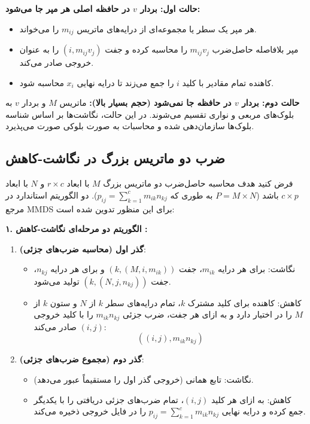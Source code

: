 \textbf{حالت اول: بردار $v$ در حافظه اصلی هر مپر جا می‌شود:}
\begin{itemize}
    \item هر مپر یک سطر یا مجموعه‌ای از درایه‌های ماتریس $m_{ij}$ را می‌خواند.
    \item مپر بلافاصله حاصل‌ضرب $m_{ij} v_j$ را محاسبه کرده و جفت $(i, m_{ij} v_j)$ را به عنوان خروجی صادر می‌کند.
    \item کاهنده تمام مقادیر با کلید $i$ را جمع می‌زند تا درایه نهایی $x_i$ محاسبه شود.
\end{itemize}

\textbf{حالت دوم: بردار $v$ در حافظه جا نمی‌شود (حجم بسیار بالا):}
ماتریس $M$ و بردار $v$ به بلوک‌های مربعی و نواری تقسیم می‌شوند. در این حالت، نگاشت‌ها بر اساس شناسه بلوک‌ها سازمان‌دهی شده و محاسبات به صورت بلوکی صورت می‌پذیرد.

\subsection{ضرب دو ماتریس بزرگ در نگاشت-کاهش \texorpdfstring{}{(Matrix Multiplication)}}
فرض کنید هدف محاسبه حاصل‌ضرب دو ماتریس بزرگ $M$ با ابعاد $r \times c$ و $N$ با ابعاد $c \times p$ باشد ($P = M \times N$ به طوری که $p_{ij} = \sum_{k=1}^c m_{ik} n_{kj}$). دو الگوریتم استاندارد در مرجع MMDS برای این منظور تدوین شده است:

\textbf{۱. الگوریتم دو مرحله‌ای نگاشت-کاهش :}
\begin{enumerate}
    \item \textbf{گذر اول (محاسبه ضرب‌های جزئی)}:
    \begin{itemize}
        \item نگاشت: برای هر درایه $m_{ik}$، جفت $(k, (M, i, m_{ik}))$ و برای هر درایه $n_{kj}$، جفت $(k, (N, j, n_{kj}))$ تولید می‌شود.
        \item کاهش: کاهنده برای کلید مشترک $k$، تمام درایه‌های سطر $k$ از $N$ و ستون $k$ از $M$ را در اختیار دارد و به ازای هر جفت، ضرب جزئی $m_{ik} n_{kj}$ را با کلید خروجی $(i, j)$ صادر می‌کند:
        \begin{equation}
        ((i, j), m_{ik} n_{kj})
        \end{equation}
    \end{itemize}
    \item \textbf{گذر دوم (مجموع ضرب‌های جزئی)}:
    \begin{itemize}
        \item نگاشت: تابع همانی (خروجی گذر اول را مستقیماً عبور می‌دهد).
        \item کاهش: به ازای هر کلید $(i, j)$، تمام ضرب‌های جزئی دریافتی را با یکدیگر جمع کرده و درایه نهایی $p_{ij} = \sum_{k=1}^c m_{ik} n_{kj}$ را در فایل خروجی ذخیره می‌کند.
    \end{itemize}
\end{enumerate}

